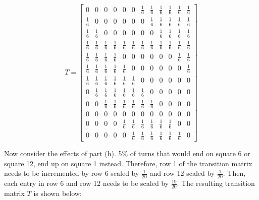 \documentclass[fleqn]{article}
\begin{document}
\begin{enumerate}[nolistsep]
\begin{enumerate}
			\begin{equation*}
				T = \begin{bmatrix}
					0 & 0 & 0 & 0 & 0 & 0 & \frac{1}{6} & \frac{1}{6} & \frac{1}{6} & \frac{1}{6} & \frac{1}{6} & \frac{1}{6}\\[3pt]
					\frac{1}{6} & 0 & 0 & 0 & 0 & 0 & 0 & \frac{1}{6} & \frac{1}{6} & \frac{1}{6} & \frac{1}{6} & \frac{1}{6}\\[3pt]
					\frac{1}{6} & \frac{1}{6} & 0 & 0 & 0 & 0 & 0 & 0 & \frac{1}{6} & \frac{1}{6} & \frac{1}{6} & \frac{1}{6}\\[3pt]
					\frac{1}{6} & \frac{1}{6} & \frac{1}{6} & \frac{1}{6} & \frac{1}{6} & \frac{1}{6} & \frac{1}{6} & \frac{1}{6} & \frac{1}{6} & \frac{1}{6} & \frac{1}{6} & \frac{1}{6}\\[3pt]
					\frac{1}{6} & \frac{1}{6} & \frac{1}{6} & \frac{1}{6} & 0 & 0 & 0 & 0 & 0 & 0 & \frac{1}{6} & \frac{1}{6}\\[3pt]
					\frac{1}{6} & \frac{1}{6} & \frac{1}{6} & \frac{1}{6} & \frac{1}{6} & 0 & 0 & 0 & 0 & 0 & 0 & \frac{1}{6}\\[3pt]
					\frac{1}{6} & \frac{1}{6} & \frac{1}{6} & \frac{1}{6} & \frac{1}{6} & \frac{1}{6} & 0 & 0 & 0 & 0 & 0 & 0\\[3pt]
					0 & \frac{1}{6} & \frac{1}{6} & \frac{1}{6} & \frac{1}{6} & \frac{1}{6} & \frac{1}{6} & 0 & 0 & 0 & 0 & 0\\[3pt]
					0 & 0 & \frac{1}{6} & \frac{1}{6} & \frac{1}{6} & \frac{1}{6} & \frac{1}{6} & \frac{1}{6} & 0 & 0 & 0 & 0\\[3pt]
					0 & 0 & 0 & 0 & 0 & 0 & 0 & 0 & 0 & 0 & 0 & 0\\[3pt]
					0 & 0 & 0 & 0 & \frac{1}{6} & \frac{1}{6} & \frac{1}{6} & \frac{1}{6} & \frac{1}{6} & \frac{1}{6} & 0 & 0\\[3pt]
					0 & 0 & 0 & 0 & 0 & \frac{1}{6} & \frac{1}{6} & \frac{1}{6} & \frac{1}{6} & \frac{1}{6} & \frac{1}{6} & 0
				\end{bmatrix}
			\end{equation*}
			
			Now consider the effects of part (h). 5\% of turns that would end on square 6 or square 12, end up on square 1 instead. Therefore, row 1 of the transition matrix needs to be incremented by row 6 scaled by $\frac{1}{20}$ and row 12 scaled by $\frac{1}{20}$. Then, each entry in row 6 and row 12 needs to be scaled by $\frac{19}{20}$. The resulting transition matrix $T$ is shown below:
			

\end{enumerate}
\end{enumerate}
\end{document}
